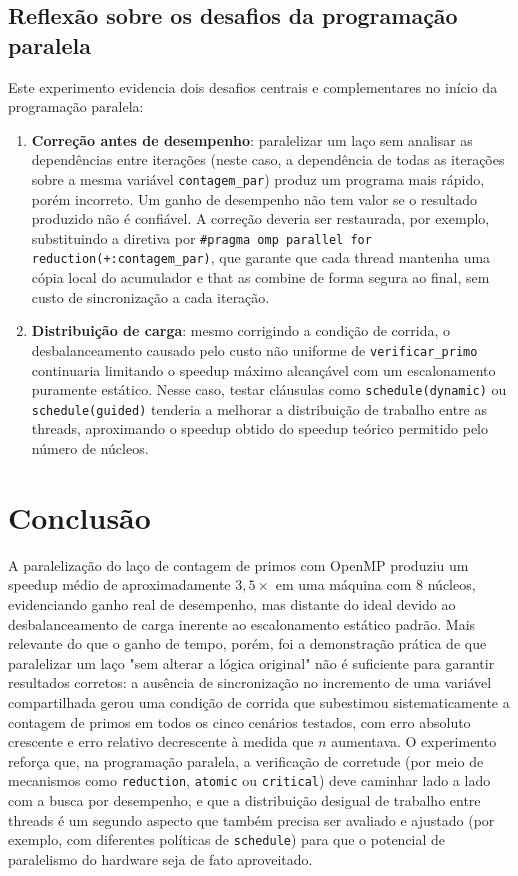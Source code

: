 \documentclass[a4paper,12pt]{article}
\begin{document}
\subsection{Reflexão sobre os desafios da programação paralela}

Este experimento evidencia dois desafios centrais e complementares no início da
programação paralela:

\begin{enumerate}
    \item \textbf{Correção antes de desempenho}: paralelizar um laço sem analisar as
    dependências entre iterações (neste caso, a dependência de todas as iterações sobre a
    mesma variável \texttt{contagem\_par}) produz um programa mais rápido, porém incorreto.
    Um ganho de desempenho não tem valor se o resultado produzido não é confiável. A
    correção deveria ser restaurada, por exemplo, substituindo a diretiva por
    \texttt{\#pragma omp parallel for reduction(+:contagem\_par)}, que garante que cada
    thread mantenha uma cópia local do acumulador e that as combine de forma segura ao
    final, sem custo de sincronização a cada iteração.
    \item \textbf{Distribuição de carga}: mesmo corrigindo a condição de corrida, o
    desbalanceamento causado pelo custo não uniforme de \texttt{verificar\_primo} continuaria
    limitando o speedup máximo alcançável com um escalonamento puramente estático. Nesse
    caso, testar cláusulas como \texttt{schedule(dynamic)} ou \texttt{schedule(guided)}
    tenderia a melhorar a distribuição de trabalho entre as threads, aproximando o speedup
    obtido do speedup teórico permitido pelo número de núcleos.
\end{enumerate}

\section{Conclusão}

A paralelização do laço de contagem de primos com OpenMP produziu um speedup médio de
aproximadamente $3{,}5\times$ em uma máquina com 8 núcleos, evidenciando ganho real de
desempenho, mas distante do ideal devido ao desbalanceamento de carga inerente ao
escalonamento estático padrão. Mais relevante do que o ganho de tempo, porém, foi a
demonstração prática de que paralelizar um laço "sem alterar a lógica original" não é
suficiente para garantir resultados corretos: a ausência de sincronização no incremento de
uma variável compartilhada gerou uma condição de corrida que subestimou sistematicamente a
contagem de primos em todos os cinco cenários testados, com erro absoluto crescente e erro
relativo decrescente à medida que $n$ aumentava. O experimento reforça que, na programação
paralela, a verificação de corretude (por meio de mecanismos como \texttt{reduction},
\texttt{atomic} ou \texttt{critical}) deve caminhar lado a lado com a busca por desempenho,
e que a distribuição desigual de trabalho entre threads é um segundo aspecto que também
precisa ser avaliado e ajustado (por exemplo, com diferentes políticas de
\texttt{schedule}) para que o potencial de paralelismo do hardware seja de fato aproveitado.
\end{document}
